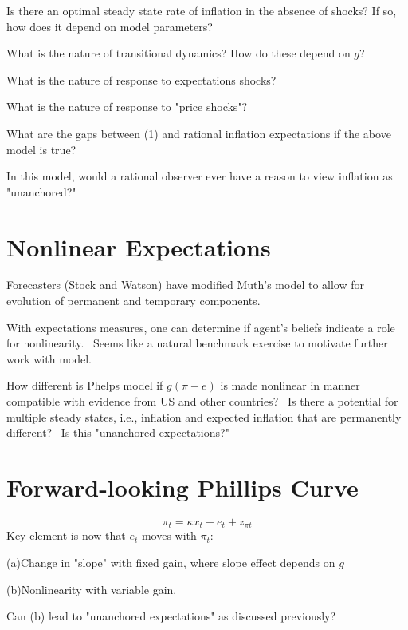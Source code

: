 \documentclass{article}%
\begin{document}
Is there an optimal steady state rate of inflation in the absence of shocks?
If so, how does it depend on model parameters?

What is the nature of transitional dynamics? How do these depend on $g$? 

What is the nature of response to expectations shocks?

What is the nature of response to "price shocks"?

\bigskip

What are the gaps between (1) and rational inflation expectations if the above
model is true?

\bigskip

In this model, would a rational observer ever have a reason to view inflation
as "unanchored?"

\bigskip

\section{Nonlinear Expectations}

Forecasters (Stock and Watson) have modified Muth's model to allow for
evolution of permanent and temporary components. \ 

With expectations measures, one can determine if agent's beliefs indicate a
role for nonlinearity. \ Seems like a natural benchmark exercise to motivate
further work with model.

How different is Phelps model if $g(\pi-e)$ is made nonlinear in manner
compatible with evidence from US and other countries? \ Is there a potential
for multiple steady states, i.e., inflation and expected inflation that are
permanently different? \ Is this "unanchored expectations?"

\bigskip

\section{Forward-looking Phillips Curve}
\[
\pi_{t}=\kappa x_{t}+e_{t}+z_{\pi t}%
\]
Key element is now that $e_{t}$ moves with $\pi_{t}$: 

(a)\qquad Change in "slope" with fixed gain, where slope effect depends on $g$

(b)\qquad Nonlinearity with variable gain. \ 

\bigskip

Can (b) lead to "unanchored expectations" as discussed previously?\ 
\end{document}
